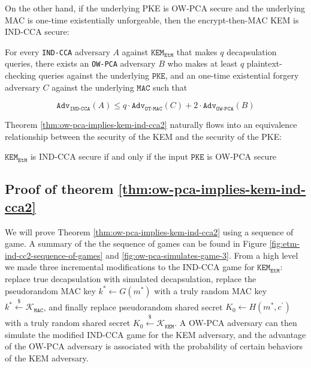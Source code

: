 \documentclass[journal=tches,submission]{iacrtrans}
\newcommand{\pke}{\texttt{PKE}}
\newcommand{\kem}{\texttt{KEM}}
\newcommand{\etm}{\texttt{EtM}}  %
\newcommand{\mac}{\texttt{MAC}}
\newcommand{\leftsample}{\stackrel{\$}{\leftarrow}}
\newcommand{\adv}{\texttt{Adv}}
\begin{document}
On the other hand, if the underlying PKE is OW-PCA secure and the underlying MAC is one-time existentially unforgeable, then the encrypt-then-MAC KEM is IND-CCA secure:

\begin{theorem}\label{thm:ow-pca-implies-kem-ind-cca2}
    For every \texttt{IND-CCA} adversary $A$ against $\kem_\etm$ that makes $q$ decapsulation queries, there exists an \texttt{OW-PCA} adversary $B$ who makes at least $q$ plaintext-checking queries against the underlying $\pke$, and an one-time existential forgery adversary $C$ against the underlying $\mac$ such that

    \begin{equation*}
        \texttt{Adv}_\texttt{IND-CCA}(A) \leq q \cdot \adv_\texttt{OT-MAC}(C) + 2 \cdot \texttt{Adv}_\texttt{OW-PCA}(B)
    \end{equation*}
\end{theorem}

Theorem \ref{thm:ow-pca-implies-kem-ind-cca2} naturally flows into an equivalence relationship between the security of the KEM and the security of the PKE:

\begin{lemma}
    $\kem_\etm$ is IND-CCA secure if and only if the input $\pke$ is OW-PCA secure
\end{lemma}

\subsection{Proof of theorem \ref{thm:ow-pca-implies-kem-ind-cca2}}\label{sec:proof-of-theorem}
We will prove Theorem \ref{thm:ow-pca-implies-kem-ind-cca2} using a sequence of game. A summary of the the sequence of games can be found in Figure \ref{fig:etm-ind-cc2-sequence-of-games} and \ref{fig:ow-pca-simulates-game-3}. From a high level we made three incremental modifications to the IND-CCA game for $\kem_\etm$: replace true decapsulation with simulated decapsulation, replace the pseudorandom MAC key $k^\ast \leftarrow G(m^\ast)$ with a truly random MAC key $k^\ast \leftsample \mathcal{K}_\mac$, and finally replace pseudorandom shared secret $K_0 \leftarrow H(m^\ast, c^\prime)$ with a truly random shared secret $K_0 \leftsample \mathcal{K}_\kem$. A OW-PCA adversary can then simulate the modified IND-CCA game for the KEM adversary, and the advantage of the OW-PCA adversary is associated with the probability of certain behaviors of the KEM adversary.
\end{document}
